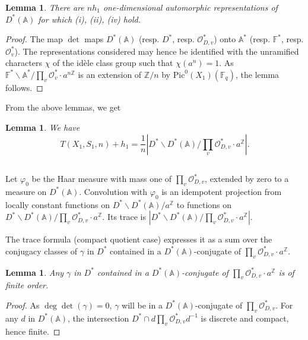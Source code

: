 \documentclass[11pt,a4paper]{article}
\theoremstyle{plain}
\newtheorem{lemma}[theorem]{Lemma}
\theoremstyle{definition}
\newcommand{\Fq}{\mathbb{F}_q}
\newcommand{\Z}{\mathbb{Z}}
\newcommand{\Pic}{\mathrm{Pic}}
\newcommand{\vp}{\varphi}
\begin{document}
\begin{lemma}
There are $n h_1$ one-dimensional automorphic representations of $D^*(\mathbb{A})$ for which (i), (ii), (iv) hold.
\end{lemma}

\begin{proof}
The map $\det$ maps $D^*(\mathbb{A})$ (resp. $D^*$, resp. $\mathcal{O}_{D,v}^*$) onto $\mathbb{A}^*$ (resp. $\mathbb{F}^*$, resp. $\mathcal{O}_v^*$). The representations considered may hence be identified with the unramified characters $\chi$ of the id\`ele class group such that $\chi(a^n) = 1$. As $\mathbb{F}^* \backslash \mathbb{A}^* / \prod_v \mathcal{O}_v^* \cdot a^{n\Z}$ is an extension of $\Z/n$ by $\Pic^0(X_1)(\Fq)$, the lemma follows.
\end{proof}

From the above lemmas, we get

\begin{lemma}
We have
\[
T(X_1,S_1,n) + h_1 = \frac{1}{n} |D^* \backslash D^*(\mathbb{A}) / \prod_v \mathcal{O}_{D,v}^* \cdot a^{\Z}|.
\]
\end{lemma}

\subsection{}
Let $\vp_0$ be the Haar measure with mass one of $\prod_v \mathcal{O}_{D,v}^*$, extended by zero to a measure on $D^*(\mathbb{A})$. Convolution with $\vp_0$ is an idempotent projection from locally constant functions on $D^* \backslash D^*(\mathbb{A}) / a^{\Z}$ to functions on $D^* \backslash D^*(\mathbb{A}) / \prod_v \mathcal{O}_{D,v}^* \cdot a^{\Z}$. Its trace is $|D^* \backslash D^*(\mathbb{A}) / \prod_v \mathcal{O}_{D,v}^* \cdot a^{\Z}|$.

The trace formula (compact quotient case) expresses it as a sum over the conjugacy classes of $\gamma$ in $D^*$ contained in a $D^*(\mathbb{A})$-conjugate of $\prod_v \mathcal{O}_{D,v}^* \cdot a^{\Z}$.

\begin{lemma}
Any $\gamma$ in $D^*$ contained in a $D^*(\mathbb{A})$-conjugate of $\prod_v \mathcal{O}_{D,v}^* \cdot a^{\Z}$ is of finite order.
\end{lemma}

\begin{proof}
As $\deg \det(\gamma) = 0$, $\gamma$ will be in a $D^*(\mathbb{A})$-conjugate of $\prod_v \mathcal{O}_{D,v}^*$. For any $d$ in $D^*(\mathbb{A})$, the intersection $D^* \cap d \prod_v \mathcal{O}_{D,v}^* d^{-1}$ is discrete and compact, hence finite.
\end{proof}
\end{document}
